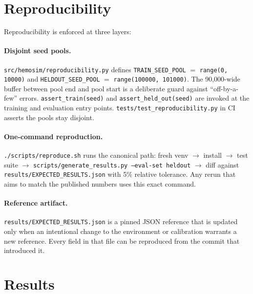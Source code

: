 \documentclass[11pt]{article}
\begin{document}
\section{Reproducibility}
\label{sec:reproducibility}

Reproducibility is enforced at three layers:

\paragraph{Disjoint seed pools.} \texttt{src/hemosim/reproducibility.py} defines \texttt{TRAIN\_SEED\_POOL} $=$ \texttt{range(0, 10000)} and \texttt{HELDOUT\_SEED\_POOL} $=$ \texttt{range(100000, 101000)}. The 90,000-wide buffer between pool end and pool start is a deliberate guard against ``off-by-a-few'' errors. \texttt{assert\_train(seed)} and \texttt{assert\_held\_out(seed)} are invoked at the training and evaluation entry points. \texttt{tests/test\_reproducibility.py} in CI asserts the pools stay disjoint.

\paragraph{One-command reproduction.} \texttt{./scripts/reproduce.sh} runs the canonical path: fresh venv $\to$ install $\to$ test suite $\to$ \texttt{scripts/generate\_results.py --eval-set heldout} $\to$ diff against \texttt{results/EXPECTED\_RESULTS.json} with 5\% relative tolerance. Any rerun that aims to match the published numbers uses this exact command.

\paragraph{Reference artifact.} \texttt{results/EXPECTED\_RESULTS.json} is a pinned JSON reference that is updated only when an intentional change to the environment or calibration warrants a new reference. Every field in that file can be reproduced from the commit that introduced it.

\section{Results}
\label{sec:results}
\end{document}
